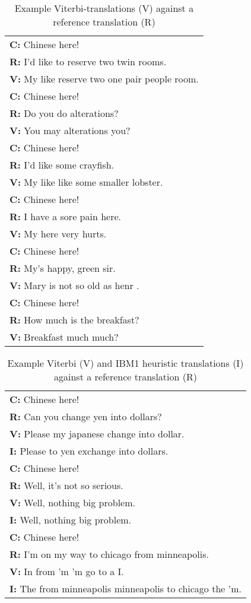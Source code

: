 \documentclass[11pt, a4paper]{article}
\begin{document}
\begin{table}
\begin{tabular}{ |l| } 
\hline
\textbf{C:} Chinese here! \\
\textbf{R:} I'd like to reserve two twin rooms. \\
\textbf{V:} My like reserve two one pair people room. \\
\hline
\textbf{C:} Chinese here! \\
\textbf{R:} Do you do alterations? \\
\textbf{V:} You may alterations you? \\
\hline
\textbf{C:} Chinese here! \\
\textbf{R:} I'd like some crayfish. \\
\textbf{V:} My like like some smaller lobster. \\
\hline
\textbf{C:} Chinese here! \\
\textbf{R:} I have a sore pain here. \\
\textbf{V:} My here very hurts. \\
\hline
\textbf{C:} Chinese here! \\
\textbf{R:} My's happy, green sir. \\
\textbf{V:} Mary is not so old as henr .\\
\hline
\textbf{C:} Chinese here! \\
\textbf{R:} How much is the breakfast? \\
\textbf{V:} Breakfast much much? \\
\hline
\end{tabular}
\caption{Example Viterbi-translations (V) against a reference translation (R)}
\label{table:translations}
\end{table}

\begin{table}
\begin{tabular}{ |l| } 
\hline
\textbf{C:} Chinese here! \\
\textbf{R:} Can you change yen into dollars? \\
\textbf{V:} Please my japanese change into dollar. \\
\textbf{I:} Please to yen exchange into dollars. \\
\hline
\textbf{C:} Chinese here! \\
\textbf{R:} Well, it's not so serious. \\
\textbf{V:} Well, nothing big problem. \\
\textbf{I:} Well, nothing big problem. \\
\hline
\textbf{C:} Chinese here! \\
\textbf{R:} I'm on my way to chicago from minneapolis. \\
\textbf{V:} In from 'm 'm go to a I. \\
\textbf{I:} The from minneapolis minneapolis to chicago the 'm. \\
\hline 
\end{tabular}
\caption{Example Viterbi (V) and IBM1 heuristic translations (I) against a reference translation (R)}
\label{table:translations-2}
\end{table}
\end{document}
